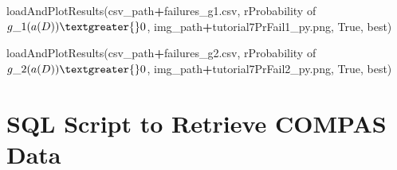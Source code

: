 \documentclass[12pt, twoside]{amherstthesis}
\newenvironment{Shaded}{\begin{snugshade}}{\end{snugshade}}
\newcommand{\NormalTok}[1]{#1}
\newcommand{\OperatorTok}[1]{\textcolor[rgb]{0.81,0.36,0.00}{\textbf{#1}}}
\newcommand{\StringTok}[1]{\textcolor[rgb]{0.31,0.60,0.02}{#1}}
\newcommand{\VariableTok}[1]{\textcolor[rgb]{0.00,0.00,0.00}{#1}}
\newcommand{\VerbatimStringTok}[1]{\textcolor[rgb]{0.31,0.60,0.02}{#1}}
\begin{document}
\begin{Shaded}
\begin{Highlighting}[]
\NormalTok{loadAndPlotResults(csv\_path}\OperatorTok{+}\StringTok{\textquotesingle{}failures\_g1.csv\textquotesingle{}}\NormalTok{,     }
\VerbatimStringTok{r\textquotesingle{}Probability of $g\_1(a(D))\textgreater{}0$\textquotesingle{}}\NormalTok{, }
\NormalTok{img\_path}\OperatorTok{+}\StringTok{\textquotesingle{}tutorial7PrFail1\_py.png\textquotesingle{}}\NormalTok{, }
\VariableTok{True}\NormalTok{,  }
\StringTok{\textquotesingle{}best\textquotesingle{}}\NormalTok{)}
\end{Highlighting}
\end{Shaded}
\begin{Shaded}
\begin{Highlighting}[]
\NormalTok{loadAndPlotResults(csv\_path}\OperatorTok{+}\StringTok{\textquotesingle{}failures\_g2.csv\textquotesingle{}}\NormalTok{,     }
\VerbatimStringTok{r\textquotesingle{}Probability of $g\_2(a(D))\textgreater{}0$\textquotesingle{}}\NormalTok{, }
\NormalTok{img\_path}\OperatorTok{+}\StringTok{\textquotesingle{}tutorial7PrFail2\_py.png\textquotesingle{}}\NormalTok{, }
\VariableTok{True}\NormalTok{,  }
\StringTok{\textquotesingle{}best\textquotesingle{}}\NormalTok{)}
\end{Highlighting}
\end{Shaded}
\hypertarget{appendix-c}{%
\chapter{SQL Script to Retrieve COMPAS Data}\label{appendix-c}}
\end{document}
